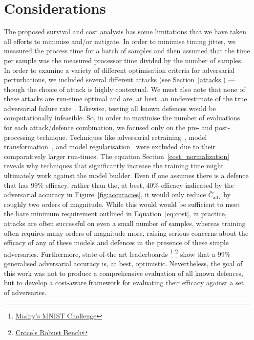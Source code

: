 \section{Considerations}
The proposed survival and cost analysis  has some limitations that we have taken all efforts to minimise and/or mitigate.
In order to minimise timing jitter, we measured the process time for a batch of samples and then assumed that the time per sample was the measured processor time divided by the number of samples.
In order to examine a variety of different optimisation criteria for adversarial perturbations, we included several different attacks (see Section~\ref{attacks}) --- though the choice of attack is highly contextual.
We must also note that none of these attacks are run-time optimal and are, at best, an underestimate of the true adversarial failure rate~\cite{meyers}.
Likewise, testing all known defences would be computationally infeasible. So, in order to maximise the number of evaluations for each attack/defence combination, we focused only on the pre- and post-processing technique.
Techniques like adversarial retraining~\cite{croce_reliable_2020}, model transformation~\cite{papernot_distillation_2016}, and model regularisation~\cite{jakubovitz2018improving} were excluded due to their comparatively larger run-times. The equation Section~\ref{cost_normalization} reveals why techniques that significantly increase the training time might ultimately work against the model builder.
Even if one assumes there is a defence that has 99\% efficacy, rather than the, at best, 40\% efficacy indicated by the adversarial accuracy in Figure~\ref{fig:accuracies}, it would only reduce $\bar{C}_{\mathrm{adv}}$ by roughly two orders of magnitude.
While this would would be sufficient to meet the bare minimum requirement outlined in Equation~\ref{eq:cost}, in practice, attacks are often successful on even a small number of samples, whereas training often requires many orders of magnitude more, raising serious concerns about the efficacy of any of these models and defences in the presence of these simple adversaries.
Furthermore, state of-the art leaderboards
\footnote{\href{https://github.com/MadryLab/mnist\_challenge}{Madry's MNIST Challenge}}
\footnote{\href{https://ml.cs.tsinghua.edu.cn/adv\-bench/}{Croce's Robust Bench}}
show that a 99\% generalised adversarial accuracy is, at best, optimistic. Nevertheless, the goal of this work was not to produce a comprehensive evaluation of all known defences, but to develop a cost-aware framework for evaluating their efficacy against a set of adversaries.

